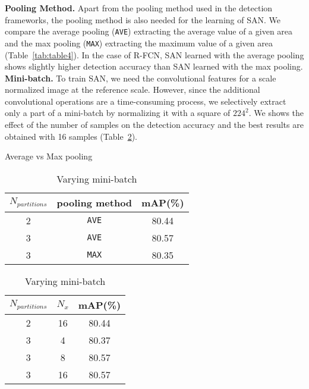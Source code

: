 \documentclass[runningheads]{llncs}
\begin{document}
\noindent
\textbf{Pooling Method.}
Apart from the pooling method used in the detection frameworks, the pooling method is also needed for the learning of SAN.
We compare the average pooling (\texttt{AVE}) extracting the average value of a given area and the max pooling (\texttt{MAX}) extracting the maximum value of a given area (Table~\ref{tab:table4}).
In the case of R-FCN, SAN learned with the average pooling shows slightly higher detection accuracy than SAN learned with the max pooling.
\\


\noindent
\textbf{Mini-batch.}
To train SAN, we need the convolutional features for a scale normalized image at the reference scale.
However, since the additional convolutional operations are a time-consuming process, we selectively extract only a part of a mini-batch by normalizing it with a square of $224^2$.
We shows the effect of the number of samples on the detection accuracy and the best results are obtained with 16 samples (Table~\ref{tab:table5}).
\\

\begin{table}[b]
	\centering
	\begin{minipage}[t]{.45\linewidth}
		\centering
		\caption{Average vs Max pooling}
		\begin{center}
			\begin{tabular}{c|c|c}
				\toprule %
				$N_{partitions}$ & pooling method & mAP(\%) \\
				\midrule %
				2 & \texttt{AVE} & 80.44 \\
				3 & \texttt{AVE} & 80.57 \\
				3 & \texttt{MAX} & 80.35 \\
				\bottomrule %
			\end{tabular}
		\end{center}
		\label{tab:table4}
	\end{minipage}
	\centering
	\begin{minipage}[t]{.45\linewidth}
		\centering
		\caption{Varying mini-batch}
		\begin{center}
			\begin{tabular}{c|c|c}
				\toprule %
				$N_{partitions}$ & $N_{x}$ & mAP(\%) \\
				\midrule %
				2 & 16 & 80.44 \\
				3 & 4 & 80.37 \\
				3 & 8 & 80.57 \\
				3 & 16 & 80.57 \\
				\bottomrule %
			\end{tabular}
		\end{center}
		\label{tab:table5}
	\end{minipage} 
\end{table}
\end{document}
